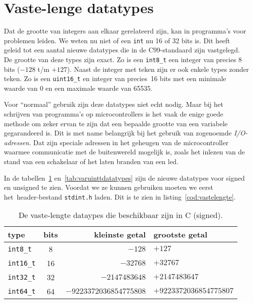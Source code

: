 \section{Vaste-lenge datatypes}
Dat de grootte van integers aan elkaar gerelateerd zijn, kan in programma's voor problemen leiden. We weten nu niet of een \texttt{int} nu 16 of 32 bits is. Dit heeft geleid tot een aantal nieuwe datatypes die in de C99-standaard zijn vastgelegd. De grootte van deze types zijn exact. Zo is een \texttt{int8\_t} een integer van precies 8 bits ($-128$ t/m $+127$). Naast de integer met teken zijn er ook enkele types zonder teken. Zo is een \texttt{uint16\_t} en integer van precies~16 bits met een minimale waarde van 0 en een maximale waarde van 65535.

Voor ``normaal'' gebruik zijn deze datatypes niet echt nodig. Maar bij het schrijven van programma's op microcontrollers is het vaak de enige goede methode om zeker ervan te zijn dat een bepaalde grootte van een variabele gegarandeerd is. Dit is met name belangrijk bij het gebruik van zogenoemde \textsl{I/O-adressen}. Dat zijn speciale adressen in het geheugen van de microcontroller waarmee communicatie met de buitenwereld mogelijk is, zoals het inlezen van de stand van een schakelaar of het laten branden van een led.

In de tabellen~\ref{tab:varinttdatatypes} en~\ref{tab:varuinttdatatypes} zijn de nieuwe datatypes voor signed en unsigned te zien. Voordat we ze kunnen gebruiken moeten we eerst het\ header-bestand \texttt{stdint.h} laden. Dit is te zien in listing~\ref{cod:vastelengte}.

\begin{table}[!ht]
\centering
\caption{De vaste-lengte dataypes die beschikbaar zijn in C (signed).}
\label{tab:varinttdatatypes}
\begin{tabular}{@{}lcrl@{}}
\toprule
\textbf{type}          & \textbf{bits} & \textbf{kleinste getal} &  \textbf{grootste getal} \\ \midrule
\texttt{int8\_t}       & 8             & $-128$                  & $+127$  \\
\texttt{int16\_t}      & 16            & $-32768$                & $+32767$  \\
\texttt{int32\_t}      & 32            & $-2147483648$           & $+2147483647$  \\
\texttt{int64\_t}      & 64            & $-9223372036854775808$  & $+9223372036854775807$  \\
\bottomrule
\end{tabular}\\
\end{table}

